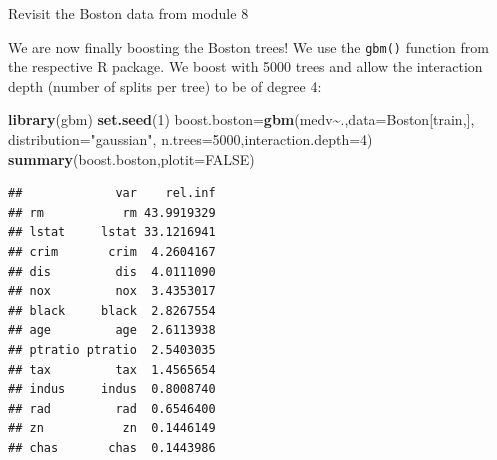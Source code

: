 \documentclass[
  10pt,
  ignorenonframetext,
]{beamer}
\newenvironment{Shaded}{\begin{snugshade}}{\end{snugshade}}
\newcommand{\AttributeTok}[1]{\textcolor[rgb]{0.13,0.29,0.53}{#1}}
\newcommand{\ConstantTok}[1]{\textcolor[rgb]{0.56,0.35,0.01}{#1}}
\newcommand{\DecValTok}[1]{\textcolor[rgb]{0.00,0.00,0.81}{#1}}
\newcommand{\FunctionTok}[1]{\textcolor[rgb]{0.13,0.29,0.53}{\textbf{#1}}}
\newcommand{\NormalTok}[1]{#1}
\newcommand{\OtherTok}[1]{\textcolor[rgb]{0.56,0.35,0.01}{#1}}
\newcommand{\SpecialCharTok}[1]{\textcolor[rgb]{0.81,0.36,0.00}{\textbf{#1}}}
\newcommand{\StringTok}[1]{\textcolor[rgb]{0.31,0.60,0.02}{#1}}
\begin{document}
\begin{frame}[fragile]
\begin{block}{Revisit the Boston data from module 8}
\label{revisit-the-boston-data-from-module-8}
\(~\)

We are now finally boosting the Boston trees! We use the \texttt{gbm()}
function from the respective R package. We boost with 5000 trees and
allow the interaction depth (number of splits per tree) to be of degree
4:

\vspace{2mm}

\scriptsize

\begin{Shaded}
\begin{Highlighting}[]
\FunctionTok{library}\NormalTok{(gbm)}
\FunctionTok{set.seed}\NormalTok{(}\DecValTok{1}\NormalTok{)}
\NormalTok{boost.boston}\OtherTok{=}\FunctionTok{gbm}\NormalTok{(medv}\SpecialCharTok{\textasciitilde{}}\NormalTok{.,}\AttributeTok{data=}\NormalTok{Boston[train,],}
                 \AttributeTok{distribution=}\StringTok{"gaussian"}\NormalTok{,}
                 \AttributeTok{n.trees=}\DecValTok{5000}\NormalTok{,}\AttributeTok{interaction.depth=}\DecValTok{4}\NormalTok{)}
\FunctionTok{summary}\NormalTok{(boost.boston,}\AttributeTok{plotit=}\ConstantTok{FALSE}\NormalTok{)}
\end{Highlighting}
\end{Shaded}

\begin{verbatim}
##             var    rel.inf
## rm           rm 43.9919329
## lstat     lstat 33.1216941
## crim       crim  4.2604167
## dis         dis  4.0111090
## nox         nox  3.4353017
## black     black  2.8267554
## age         age  2.6113938
## ptratio ptratio  2.5403035
## tax         tax  1.4565654
## indus     indus  0.8008740
## rad         rad  0.6546400
## zn           zn  0.1446149
## chas       chas  0.1443986
\end{verbatim}
\end{block}
\end{frame}
\end{document}
